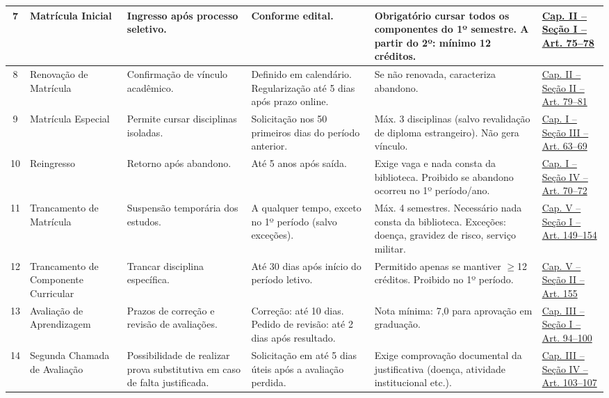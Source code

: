 \documentclass[authoryear]{elsarticle}
\begin{document}
\begin{longtable}{|c|p{3cm}|p{3cm}|p{3.5cm}|p{3.5cm}|p{2cm}|}
	\hline
	7 & Matrícula Inicial & Ingresso após processo seletivo. & Conforme edital. & Obrigatório cursar todos os componentes do 1º semestre. A partir do 2º: mínimo 12 créditos. & \href{https://github.com/JonathaCosta-IA/CCECA/blob/main/02_Rod_atualizado1.pdf}{Cap. II – Seção I – Art. 75--78} \\
	\hline
	8 & Renovação de Matrícula & Confirmação de vínculo acadêmico. & Definido em calendário. Regularização até 5 dias após prazo online. & Se não renovada, caracteriza abandono. & \href{https://github.com/JonathaCosta-IA/CCECA/blob/main/02_Rod_atualizado1.pdf}{Cap. II – Seção II – Art. 79--81} \\
	\hline
	9 & Matrícula Especial & Permite cursar disciplinas isoladas. & Solicitação nos 50 primeiros dias do período anterior. & Máx. 3 disciplinas (salvo revalidação de diploma estrangeiro). Não gera vínculo. & \href{https://github.com/JonathaCosta-IA/CCECA/blob/main/02_Rod_atualizado1.pdf}{Cap. I – Seção III – Art. 63--69} \\
	\hline
	10 & Reingresso & Retorno após abandono. & Até 5 anos após saída. & Exige vaga e nada consta da biblioteca. Proibido se abandono ocorreu no 1º período/ano. & \href{https://github.com/JonathaCosta-IA/CCECA/blob/main/02_Rod_atualizado1.pdf}{Cap. I – Seção IV – Art. 70--72} \\
	\hline
	11 & Trancamento de Matrícula & Suspensão temporária dos estudos. & A qualquer tempo, exceto no 1º período (salvo exceções). & Máx. 4 semestres. Necessário nada consta da biblioteca. Exceções: doença, gravidez de risco, serviço militar. & \href{https://github.com/JonathaCosta-IA/CCECA/blob/main/02_Rod_atualizado1.pdf}{Cap. V – Seção I – Art. 149--154} \\
	\hline
	12 & Trancamento de Componente Curricular & Trancar disciplina específica. & Até 30 dias após início do período letivo. & Permitido apenas se mantiver $\geq$12 créditos. Proibido no 1º período. & \href{https://github.com/JonathaCosta-IA/CCECA/blob/main/02_Rod_atualizado1.pdf}{Cap. V – Seção II – Art. 155} \\
	\hline
	13 & Avaliação de Aprendizagem & Prazos de correção e revisão de avaliações. & Correção: até 10 dias. Pedido de revisão: até 2 dias após resultado. & Nota mínima: 7,0 para aprovação em graduação. & \href{https://github.com/JonathaCosta-IA/CCECA/blob/main/02_Rod_atualizado1.pdf}{Cap. III – Seção I – Art. 94--100} \\
	\hline
	14 & Segunda Chamada de Avaliação & Possibilidade de realizar prova substitutiva em caso de falta justificada. & Solicitação em até 5 dias úteis após a avaliação perdida. & Exige comprovação documental da justificativa (doença, atividade institucional etc.). & \href{https://github.com/JonathaCosta-IA/CCECA/blob/main/02_Rod_atualizado1.pdf}{Cap. III – Seção IV – Art. 103--107} \\

\end{longtable}
\end{document}
